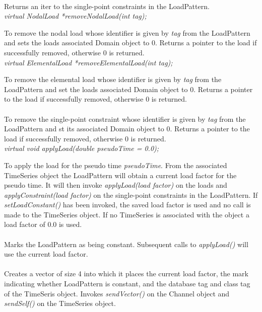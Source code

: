 \\ 
Returns an iter to the single-point constraints in the LoadPattern. \\
    
{\em  virtual NodalLoad *removeNodalLoad(int tag);}

To remove the nodal load whose identifier is given by {\em tag} from
the LoadPattern and sets the loads associated Domain object to
$0$. Returns a pointer to the load if successfully removed, otherwise
$0$ is returned. \\ 

{\em  virtual ElementalLoad *removeElementalLoad(int tag);}

To remove the elemental load whose identifier is given by {\em tag} from
the LoadPattern and set the loads associated Domain object to
$0$. Returns a pointer to the load if successfully removed, otherwise
$0$ is returned. \\ 

\\ 
To remove the single-point constraint whose identifier is given by {\em tag} from
the LoadPattern and st its associated Domain object to $0$. Returns a
pointer to the load if successfully removed, otherwise $0$ is
returned. \\ 

{\em  virtual void applyLoad(double pseudoTime = 0.0);}

To apply the load for the pseudo time {\em pseudoTime}. From the
associated TimeSeries object the LoadPattern will obtain a current
load factor for the pseudo time. It will then invoke {\em
applyLoad(load factor)} on the loads and {\em applyConstraint(load
factor)} on the single-point constraints in the LoadPattern. If {\em
setLoadConstant()} has been invoked, the saved load factor is used and
no call is made to the TimeSeries object. If no TimeSeries is
associated with the object a load factor of $0.0$ is used. \\

\\ 
Marks the LoadPattern as being constant. Subsequent calls to {\em
applyLoad()} will use the current load factor. \\

\\
Creates a vector of size 4 into which it places the current load
factor, the mark indicating whether LoadPattern is constant, and the
database tag and class tag of the TimeSeris object. Invokes {\em
sendVector()} on the Channel object and {\em sendSelf()} on the
TimeSeries object. \\

